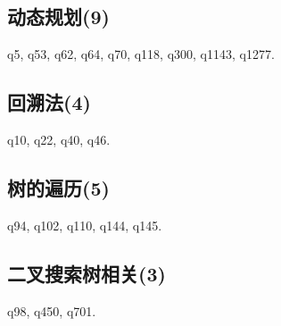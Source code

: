 \subsection{动态规划(9)}
q5,
q53,
q62,
q64,
q70,
q118,
q300,
q1143,
q1277.

\subsection{回溯法(4)}

q10,
q22,
q40,
q46.

\subsection{树的遍历(5)}

q94,
q102,
q110,
q144,
q145.

\subsection{二叉搜索树相关(3)}

q98,
q450,
q701.

